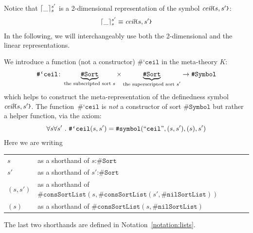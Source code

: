 \documentclass[UTF8,11pt]{article}
\theoremstyle{plain}
\theoremstyle{definition}
\theoremstyle{remark}
\DeclarePairedDelimiter{\ceil}{\lceil}{\rceil}
\newcommand{\cln}{\texttt{:}}
\newcommand{\itceil}{\textit{ceil}}
\newcommand{\parametric}[2]{{#1}\raisebox{.2ex}{\texttt{\footnotesize{\{}}}#2\raisebox{.2ex}{\texttt{\footnotesize{\}}}}}
\newcommand{\sharpsymbol}{\#}
\newcommand{\KSort}{\texttt{\sharpsymbol Sort}}
\newcommand{\KSymbol}{\texttt{\sharpsymbol Symbol}}
\newcommand{\Ksymbol}{\texttt{\sharpsymbol symbol}}
\newcommand{\KSymbolceil}{\texttt{\sharpsymbol `ceil}}
\newcommand{\KnilKSortList}{\texttt{\sharpsymbol nilSortList}}
\newcommand{\KconsKSortList}{\texttt{\sharpsymbol consSortList}}
\newcommand{\qquottt}[1]{\textrm{``\texttt{#1}''}}
\begin{document}
Notice that $\ceil{\_}_s^{s'}$ is a 2-dimensional representation of the symbol 
$\parametric{\itceil}{s,s'}$:
$$ \ceil{\_}_s^{s'} \equiv \parametric{\itceil}{s,s'} $$
In the following, we will interchangeably use both the 2-dimensional 
and the linear representations.

We introduce a function (not a constructor) $\KSymbolceil$ in the meta-theory 
$K$:
\begin{equation*}
 \KSymbolceil \colon 
 \underbrace{\KSort}_\text{the subscripted sort $s$}
 \times 
 \underbrace{\KSort}_\text{the superscripted sort $s'$} \to \KSymbol \\
\end{equation*}
which helps to construct the meta-representation of the definedness symbol 
$\parametric{\itceil}{s,s'}$.
The function~$\KSymbolceil$ is \emph{not} a constructor of sort $\KSymbol$ but 
rather a helper function, via the axiom:
\begin{equation*}
 \forall s \forall s' \ .\ \KSymbolceil(s, s') = \Ksymbol(\qquottt{ceil}, (s,s'), 
 (s), s')
\end{equation*}
Here we are writing
\begin{center}
\begin{tabular}{ll}
	$s$ & as a shorthand of $s \cln \KSort$ \\
	$s'$ & as a shorthand of $s' \cln \KSort$ \\
    $(s,s')$ & as a shorthand of 
    $\KconsKSortList(s,\KconsKSortList(s',\KnilKSortList))$ \\
    $(s)$ & as a shorthand of $\KconsKSortList(s,\KnilKSortList)$
\end{tabular}
\end{center}
The last two shorthands are defined in Notation~\ref{notation:lists}.
\end{document}
